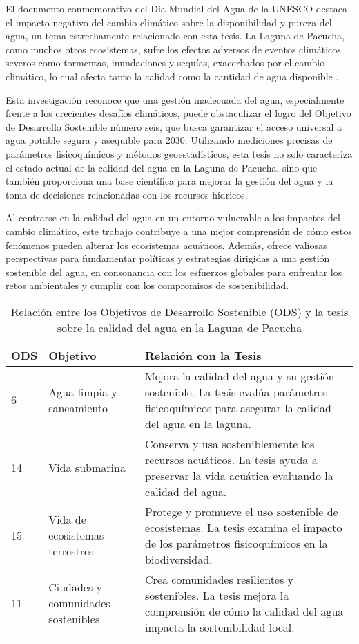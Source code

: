 El documento conmemorativo del Día Mundial del Agua de la UNESCO destaca el impacto negativo del cambio climático sobre la disponibilidad y pureza del agua, un tema estrechamente relacionado con esta tesis. La Laguna de Pacucha, como muchos otros ecosistemas, sufre los efectos adversos de eventos climáticos severos como tormentas, inundaciones y sequías, exacerbados por el cambio climático, lo cual afecta tanto la calidad como la cantidad de agua disponible \cite{UN2020Agua}.

Esta investigación reconoce que una gestión inadecuada del agua, especialmente frente a los crecientes desafíos climáticos, puede obstaculizar el logro del Objetivo de Desarrollo Sostenible número seis, que busca garantizar el acceso universal a agua potable segura y asequible para 2030. Utilizando mediciones precisas de parámetros fisicoquímicos y métodos geoestadísticos, esta tesis no solo caracteriza el estado actual de la calidad del agua en la Laguna de Pacucha, sino que también proporciona una base científica para mejorar la gestión del agua y la toma de decisiones relacionadas con los recursos hídricos.

Al centrarse en la calidad del agua en un entorno vulnerable a los impactos del cambio climático, este trabajo contribuye a una mejor comprensión de cómo estos fenómenos pueden alterar los ecosistemas acuáticos. Además, ofrece valiosas perspectivas para fundamentar políticas y estrategias dirigidas a una gestión sostenible del agua, en consonancia con los esfuerzos globales para enfrentar los retos ambientales y cumplir con los compromisos de sostenibilidad.

\begin{table}[H]
\centering
\caption{Relación entre los Objetivos de Desarrollo Sostenible (ODS) y la tesis sobre la calidad del agua en la Laguna de Pacucha}
\begin{tabular}{p{0.7cm}p{3cm}p{9cm}}
\hline
\textbf{ODS} & \textbf{Objetivo}                      & \textbf{Relación con la Tesis}                                                                                                           \\ \hline
6            & Agua limpia y saneamiento              & Mejora la calidad del agua y su gestión sostenible. La tesis evalúa parámetros fisicoquímicos para asegurar la calidad del agua en la laguna. \\ \hline
14           & Vida submarina                         & Conserva y usa sosteniblemente los recursos acuáticos. La tesis ayuda a preservar la vida acuática evaluando la calidad del agua.            \\ \hline
15           & Vida de ecosistemas terrestres         & Protege y promueve el uso sostenible de ecosistemas. La tesis examina el impacto de los parámetros fisicoquímicos en la biodiversidad.       \\ \hline
11           & Ciudades y comunidades sostenibles     & Crea comunidades resilientes y sostenibles. La tesis mejora la comprensión de cómo la calidad del agua impacta la sostenibilidad local.      \\ \hline
\end{tabular}
\label{table:ODS_relation}
\end{table}


